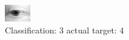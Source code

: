 \begin{figure}[h!]
\begin{center}
\includegraphics[width=0.60\columnwidth]{figures/ID2581_class_3_target_4.png}
\end{center}
\caption{ Classification: 3 actual target: 4}
\label{fig:ID2581_class_3_target_4}
\end{figure}
